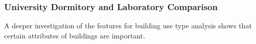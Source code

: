\subsubsection{University Dormitory and Laboratory Comparison}
\label{sec:dormvslab}

A deeper investigation of the features for building use type analysis shows that certain attributes of buildings are important.